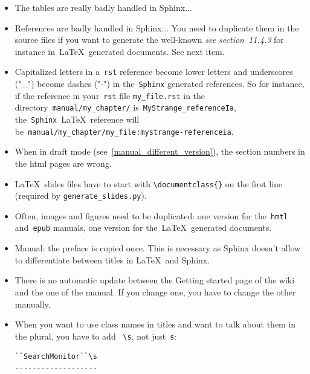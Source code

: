 \documentclass[a4paper,10pt]{article}
\newcommand{\code}[1]{\texttt{#1}}
\begin{document}
\begin{itemize}
\item The tables are really badly handled in Sphinx...
\item References are badly handled in Sphinx... You need to duplicate them in the source files if you want to generate the well-known \emph{see section~11.4.3} for instance in~\LaTeX\ generated documents. See next item.
  \item Capitalized letters in a~\code{rst} reference become lower letters and underscores ("\_") become dashes ("-") in the~\code{Sphinx} generated references. So for instance, if the reference in your~\code{rst} file \code{my\_file.rst} in the directory~\code{manual/my\_chapter/} is~\code{MyStrange\_referenceIa}, the~\code{Sphinx}~\LaTeX~reference will be~\code{manual/my\_chapter/my\_file:mystrange-referenceia}. 


 \item When in draft mode (see~\ref{manual_different_version}), the section numbers in the html pages are wrong. 
 \item \LaTeX\ slides files have to start with \code{\textbackslash documentclass\{\}} on the first line (required by \code{generate\_slides.py}).
\item Often, images and figures need to be duplicated: one version for the~\code{hmtl} and~\code{epub} manuals, one version for the~\LaTeX\ generated documents.
 \item Manual: the preface is copied once. This is necessary as Sphinx doesn't allow to differentiate between titles in \LaTeX\ and Sphinx.
 \item There is no automatic update between the Getting started page of the wiki and the one of the manual. If you change one, you have to change the other manually. 
 \item When you want to use class names in titles and want to talk about them in the plural, you have to add ~\verb+\s+, not just~\verb+s+:
  \begin{verbatim}
``SearchMonitor``\s
-------------------
  \end{verbatim}
\end{itemize}
\end{document}
